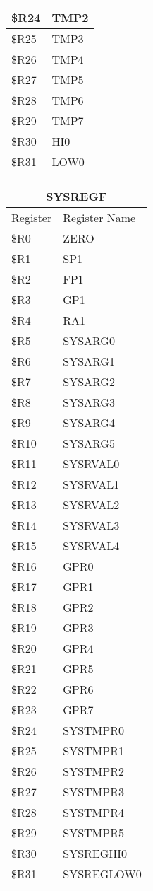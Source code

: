 \documentclass[letterpaper, 11pt]{article}
\begin{document}
\begin{figure}[!h]
{\begin{tabular}{|l|l|}
			\$R24 & TMP2  \\ \hline
			\$R25 & TMP3  \\ \hline
			\$R26 & TMP4  \\ \hline
			\$R27 & TMP5  \\ \hline
			\$R28 & TMP6  \\ \hline
			\$R29 & TMP7  \\ \hline
			\$R30 & HI0  \\ \hline
			\$R31 & LOW0  \\ \hline
		\end{tabular}
	}
	\hfill
	\parbox{0.5\linewidth}{
		\centering
		\fontsize{10}{12}\selectfont
		\begin{tabular}{|l|l|}
			\hline
			\multicolumn{2}{|c|}{SYSREGF} \\
			\hline
			Register & Register Name \\ \hline
			\$R0  & ZERO \\ 	\hline
			\$R1  & SP1 \\ 	\hline
			\$R2  & FP1 \\ 	\hline
			\$R3  & GP1 \\ 	\hline
			\$R4  & RA1 \\ 	\hline
			\$R5  & SYSARG0 \\ 	\hline
			\$R6  & SYSARG1 \\ 	\hline
			\$R7  & SYSARG2 \\ 	\hline
			\$R8  & SYSARG3 \\ 	\hline
			\$R9  & SYSARG4 \\ 	\hline
			\$R10 & SYSARG5 \\ \hline
			\$R11 & SYSRVAL0  \\ \hline
			\$R12 & SYSRVAL1  \\ \hline
			\$R13 & SYSRVAL2  \\ \hline
			\$R14 & SYSRVAL3  \\ \hline
			\$R15 & SYSRVAL4  \\ \hline
			\$R16 & GPR0  \\ \hline
			\$R17 & GPR1  \\ \hline
			\$R18 & GPR2  \\ \hline
			\$R19 & GPR3  \\ \hline
			\$R20 & GPR4  \\ \hline
			\$R21 & GPR5  \\ \hline
			\$R22 & GPR6  \\ \hline
			\$R23 & GPR7  \\ \hline
			\$R24 & SYSTMPR0  \\ \hline
			\$R25 & SYSTMPR1  \\ \hline
			\$R26 & SYSTMPR2  \\ \hline
			\$R27 & SYSTMPR3  \\ \hline
			\$R28 & SYSTMPR4  \\ \hline
			\$R29 & SYSTMPR5  \\ \hline
			\$R30 & SYSREGHI0  \\ \hline
			\$R31 & SYSREGLOW0  \\ \hline
		\end{tabular}
	}
\end{figure}
\end{document}
